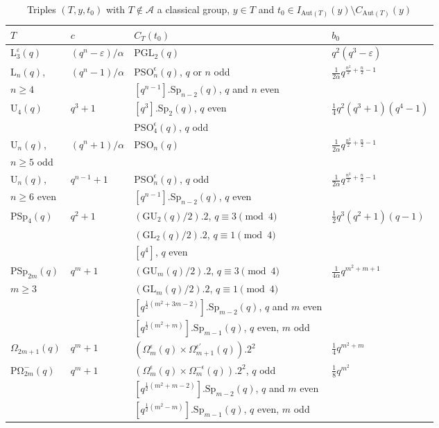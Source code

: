 \documentclass[twoside,a4paper,reqno,11pt]{amsart}
\newcommand{\e}{\varepsilon}
\newcommand{\<}{\langle}
\renewcommand{\>}{\rangle}
\newcommand{\geqs}{\geqslant}
\newcommand{\Aut}{\mathrm{Aut}}
\newcommand{\GL}{\mathrm{GL}}
\newcommand{\PGL}{\mathrm{PGL}}
\newcommand{\PSp}{\mathrm{PSp}}
\newcommand{\Sp}{\mathrm{Sp}}
\newcommand{\POmega}{\mathrm{P\Omega}}
\newcommand{\LL}{\mathrm{L}}
\newcommand{\UU}{\mathrm{U}}
\newcommand{\GU}{\mathrm{GU}}
\theoremstyle{definition}
\begin{document}
{\small
	\centering
	\begin{table}
		\caption{Triples $(T,y,t_0)$ with $T\notin\mathcal{A}$ a classical group, $y \in T$ and $t_0 \in I_{\Aut(T)}(y) \setminus C_{\Aut(T)}(y)$}
		\begin{tabular}{@{}llll@{}}
			\toprule
			$T$ & $c$  & $C_T(t_0)$ & $b_0$ \\ \midrule
            $\LL_3^\e(q)$ & $(q^n-\e)/\alpha$ & $\PGL_2(q)$ 
            & $q^2(q^3-\e)$ \\ \hline
			$\LL_n(q)$,  & $(q^n-1)/\alpha$ & $\mathrm{PSO}_n^\epsilon(q)$, $q$ or $n$ odd & $\frac{1}{2\alpha}q^{\frac{n^2}{2}+\frac{n}{2}-1}$\\
			$n\geqs 4$ && $[q^{n-1}].\Sp_{n-2}(q)$, $q$ and $n$ even & \\
            \hline
            $\UU_4(q)$ & $q^3 + 1$ & $[q^3].\Sp_2(q)$, $q$ even & $\frac{1}{4}q^2(q^3+1)(q^4-1)$
            \\
            & & $\mathrm{PSO}_4^\epsilon(q)$, $q$ odd & \\
            \hline 
			$\UU_n(q)$,  & $(q^n+1)/\alpha$ & $\mathrm{PSO}_n(q)$ & $\frac{1}{2\alpha}q^{\frac{n^2}{2} + \frac{n}{2}-1}$\\
            $n\geqs 5$ odd & \\
            \hline 
 			$\UU_n(q)$, & $q^{n-1}+1$ & $\mathrm{PSO}_n^\epsilon(q)$, $q$ odd & $\frac{1}{2\alpha}q^{\frac{n^2}{2} + \frac{n}{2}-1}$\\
			$n \geqs 6 $ even & & $[q^{n-1}].\Sp_{n-2}(q)$, $q$ even 
            \\
            \hline 
            $\PSp_4(q)$ & $q^2 + 1$ & $(\GU_2(q)/2).2$, $q \equiv 3 \pmod 4$ & $\frac{1}{2}q^3(q^2 + 1)(q - 1)$\\
            & & $(\GL_2(q)/2).2$, $q \equiv 1 \pmod 4$ & \\
            && $[q^4]$, $q$ even &\\
            \hline 
			$\PSp_{2m}(q)$ & $q^m+1$ & $(\GU_m(q)/2).2$, $q\equiv 3 \pmod 4$ & $\frac{1}{4\alpha}q^{m^2+m+1}$\\
            $m \geqs 3$ && $(\GL_m(q)/2).2$, $q \equiv 1 \pmod 4$ &\\
			&& $[q^{\frac{1}{2}(m^2+3m-2)}].\Sp_{m-2}(q)$, $q$ and $m$ even&\\
			&& $[q^{\frac{1}{2}(m^2+m)}].\Sp_{m-1}(q)$, $q$ even, $m$ odd&\\
            \hline 
			$\Omega_{2m+1}(q)$ & $q^m+1$ & $(\Omega_m^\epsilon(q)\times \Omega_{m+1}^{\epsilon'}(q)).2^2$ & $\frac{1}{4}q^{m^2+m}$\\
			\hline 
			$\POmega_{2m}^-(q)$ & $q^m+1$ & $(\Omega_m^\epsilon(q)\times\Omega_m^{-\epsilon}(q)).2^2$, $q$ odd & $\frac{1}{8}q^{m^2}$\\
			&& $[q^{\frac{1}{2}(m^2+m-2)}].\Sp_{m-2}(q)$, $q$ and $m$ even\\
			&& $[q^{\frac{1}{2}(m^2-m)}].\Sp_{m-1}(q)$, $q$ even, $m$ odd\\
			\bottomrule
		\end{tabular}
		\label{tab:class_uni}
	\end{table}
}
\end{document}
